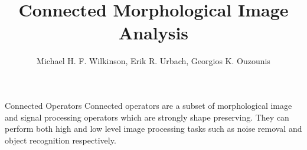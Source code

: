 \documentclass[b1,largefonts,plainsections]{sciposter}
\title{Connected Morphological Image Analysis}
\author{Michael H. F. Wilkinson, Erik R. Urbach, Georgios K. Ouzounis}
\institute{Institute for Mathematics and Computing Science\\
           University of Groningen\\}
\begin{document}



\maketitle

\setlength{\columnseprule}{0pt}
\setlength{\columnsep}{0.0192\textheight}

\begin{multicols}{2}


\newcommand{\imsize}{0.3\columnwidth}


\begin{sectionbox}{Connected Operators}
Connected operators are a subset of morphological image and signal
processing operators which are strongly shape preserving. They
can perform both high and low level image processing tasks
such as noise removal and object recognition respectively.


\end{sectionbox}
\end{multicols}
\end{document}
